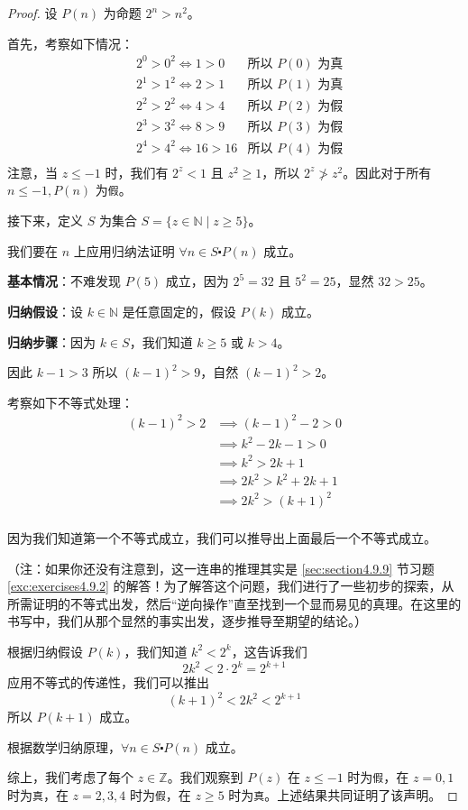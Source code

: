 \begin{proof}
    设 $P(n)$ 为命题 $2^n > n^2$。

    首先，考察如下情况：
    \begin{align*}
        & 2^0 > 0^2 \iff 1>0 & \text{所以 } P(0) \text{ 为真}\\
        & 2^1 > 1^2 \iff 2>1 & \text{所以 } P(1) \text{ 为真}\\
        & 2^2 > 2^2 \iff 4>4 &  \text{所以 } P(2) \text{ 为假}\\
        & 2^3 > 3^2 \iff 8>9 &  \text{所以 } P(3) \text{ 为假}\\
        & 2^4 > 4^2 \iff 16>16 & \text{所以 } P(4) \text{ 为假}\\
    \end{align*}
    注意，当 $z \le -1$ 时，我们有 $2^z < 1$ 且 $z^2 \ge 1$，所以 $2^z \ngtr z^2$。因此对于所有 $n \le -1, P(n)$ 为\verb|假|。

    接下来，定义 $S$ 为集合 $S = \{z \in \mathbb{N} \mid z \ge 5\}$。

    我们要在 $n$ 上应用归纳法证明 $\forall n \in S \centerdot P(n)$ 成立。

    \textbf{基本情况}：不难发现 $P(5)$ 成立，因为 $2^5=32$ 且 $5^2=25$，显然 $32 > 25$。

    \textbf{归纳假设}：设 $k \in \mathbb{N}$ 是任意固定的，假设 $P(k)$ 成立。

    \textbf{归纳步骤}：因为 $k \in S$，我们知道 $k \ge 5$ 或 $k > 4$。
    
    因此 $k-1>3$ 所以 $(k-1)^2>9$，自然 $(k-1)^2>2$。

    考察如下不等式处理：
    \begin{align*}
        (k-1)^2 > 2 &\implies (k-1)^2-2>0 \\
        &\implies k^2-2k-1>0 \\
        &\implies k^2>2k+1 \\
        &\implies 2k^2>k^2+2k+1 \\
        &\implies 2k^2>(k+1)^2 \\
    \end{align*}

    因为我们知道第一个不等式成立，我们可以推导出上面最后一个不等式成立。

    （注：如果你还没有注意到，这一连串的推理其实是 \ref{sec:section4.9.9} 节习题 \ref{exc:exercises4.9.2} 的解答！为了解答这个问题，我们进行了一些初步的探索，从所需证明的不等式出发，然后``逆向操作''直至找到一个显而易见的真理。在这里的书写中，我们从那个显然的事实出发，逐步推导至期望的结论。）

    根据归纳假设 $P(k)$，我们知道 $k^2 < 2^k$，这告诉我们
    \[2k^2 < 2 \cdot 2^k = 2^{k+1}\]
    应用不等式的传递性，我们可以推出
    \[(k + 1)^2 < 2k^2 < 2^{k+1}\]
    所以 $P(k+1)$ 成立。

    根据数学归纳原理，$\forall n \in S \centerdot P(n)$ 成立。

    综上，我们考虑了每个 $z \in \mathbb{Z}$。我们观察到 $P(z)$ 在 $z \le -1$ 时为\verb|假|，在 $z = 0, 1$ 时为\verb|真|，在 $z = 2, 3, 4$ 时为\verb|假|，在 $z \ge 5$ 时为\verb|真|。上述结果共同证明了该声明。
\end{proof}

